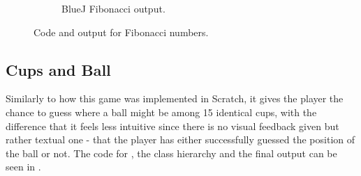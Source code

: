 \begin{figure}[!h]
\begin{subfigure}[b]{0.45\textwidth}
\begin{center}
      \caption{BlueJ Fibonacci output.}
      \label{fig:bluej_fibo_code2}
    \end{center}
    \end{subfigure}
    \caption{Code and output for Fibonacci numbers.}
    \label{fig:bluej_fibo}
\end{figure}
\subsection{Cups and Ball}
Similarly to how this game was implemented in Scratch, it gives the player the chance to guess where a ball might be among 15 identical cups, with the difference that it feels less intuitive since there is no visual feedback given but rather textual one - that the player has either successfully guessed the position of the ball or not. The code for , the class hierarchy and the final output can be seen in .

